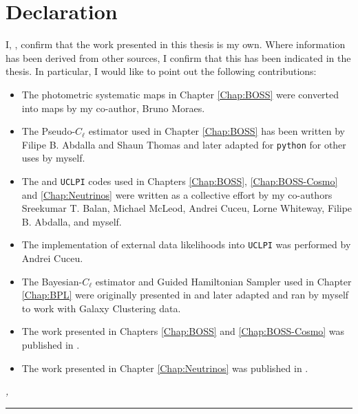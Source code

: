 %
\chapter*{Declaration}
\label{sec:declaration}
\thispagestyle{empty}

I, \thesisName , confirm that the work presented in this thesis is my own.
         Where information has been derived from other sources, I confirm that this has been indicated in the thesis. In particular, I would like to point out the following contributions:
\begin{itemize}
    \item The photometric systematic maps in Chapter \ref{Chap:BOSS} were converted into \healpix maps by my co-author, Bruno Moraes.
    \item The Pseudo-$C_{\ell}$ estimator used in Chapter \ref{Chap:BOSS} has been written by Filipe B. Abdalla and Shaun Thomas and later adapted for \texttt{python} for other uses by myself.
    \item The \uclcl and \texttt{UCLPI} codes used in Chapters \ref{Chap:BOSS}, \ref{Chap:BOSS-Cosmo} and \ref{Chap:Neutrinos} were written as a collective effort by my co-authors Sreekumar T. Balan, Michael McLeod, Andrei Cuceu, Lorne Whiteway, Filipe B. Abdalla, and myself.
    \item The implementation of external data likelihoods into \texttt{UCLPI} was performed by Andrei Cuceu.
    \item The Bayesian-$C_{\ell}$ estimator and Guided Hamiltonian Sampler used in Chapter \ref{Chap:BPL} were originally presented in \cite{SreeThesis} and later adapted and ran by myself to work with Galaxy Clustering data.
    \item The work presented in Chapters \ref{Chap:BOSS} and \ref{Chap:BOSS-Cosmo} was published in \cite{2018LoureiroBOSS}.
    \item The work presented in Chapter \ref{Chap:Neutrinos} was published in \cite{2018LoureiroNeutrinos}.
\end{itemize}
         
\vspace*{\fill}

\noindent\textit{\thesisUniversityCity, \thesisDate}

\smallskip

\begin{flushright}
	\begin{minipage}{5cm}
		\rule{\textwidth}{1pt}
		\centering\thesisName
	\end{minipage}
\end{flushright}

